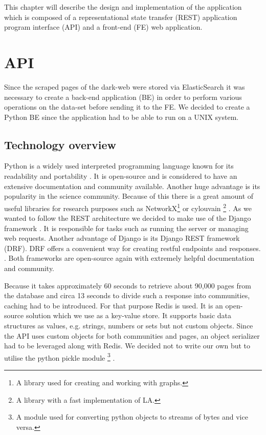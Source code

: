 This chapter will describe the design and implementation of the application which is composed of a representational state transfer (REST) application program interface (API) and a front-end (FE) web application. 

\section{API}
Since the scraped pages of the dark-web were stored via ElasticSearch it was necessary to create a back-end application (BE) in order to perform various operations on the data-set before sending it to the FE. We decided to create a Python BE since the application had to be able to run on a UNIX system. 
\subsection{Technology overview}
Python is a widely used interpreted programming language known for its  readability and portability \cite{aboutPython}. It is open-source and is considered to have an extensive documentation and community available. Another huge advantage is its popularity in the science community. Because of this there is a great amount of useful libraries for research purposes such as NetworkX\footnote{A library used for creating and working with graphs.} \cite{networkX} or cylouvain \footnote{A library with a fast implementation of LA.} \cite{cylouvain}.  
As we wanted to follow the REST architecture we decided to make use of the Django framework \cite{meetDjango}. It is responsible for tasks such as running the server or managing web requests. Another advantage of Django is its Django REST framework (DRF). DRF offers a convenient way for creating restful endpoints and responses. \cite{djangoRest}. Both frameworks are open-source again with extremely helpful documentation and community. 


Because it takes approximately 60 seconds to retrieve about 90,000 pages from the database and circa 13 seconds to divide such a response into communities, caching had to be introduced. For that purpose Redis \cite{redis} is used. It is an open-source solution which we use as a key-value store. It supports  basic data structures as values, e.g. strings, numbers or sets but not custom objects. Since the API uses custom objects for both communities and pages, an object serializer had to be leveraged along with Redis. We decided not to write our own but to utilise the python pickle module \footnote{A module used for converting python objects to streams of bytes and vice versa.} \cite{pickle}. 

